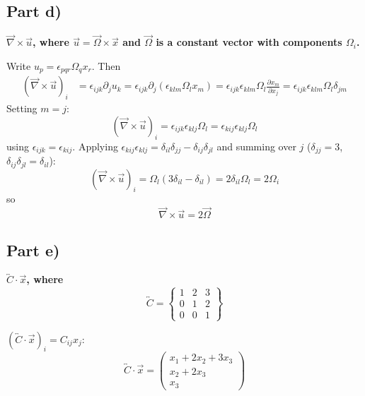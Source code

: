 \documentclass[12pt]{article}
\newcommand{\pd}[2]{\frac{\partial #1}{\partial #2}}
\newcommand{\ten}[1]{\overleftrightarrow{#1}}
\begin{document}
\subsection*{Part d)}
\textbf{$\vec\nabla \times \vec u$, where $\vec u = \vec\Omega \times \vec x$ and $\vec\Omega$ is a constant vector with components $\Omega_i$.}

Write $u_p = \epsilon_{pqr}\Omega_qx_r$. Then
\begin{align*}
    (\vec\nabla\times\vec u)_i &= \epsilon_{ijk}\partial_ju_k = \epsilon_{ijk}\partial_j\left(\epsilon_{klm}\Omega_lx_m\right) = \epsilon_{ijk}\epsilon_{klm}\Omega_l\pd{x_m}{x_j} = \epsilon_{ijk}\epsilon_{klm}\Omega_l\delta_{jm}
\end{align*}
Setting $m = j$:
\begin{equation*}
    (\vec\nabla\times\vec u)_i = \epsilon_{ijk}\epsilon_{klj}\Omega_l = \epsilon_{kij}\epsilon_{klj}\Omega_l
\end{equation*}
using $\epsilon_{ijk} = \epsilon_{kij}$. Applying $\epsilon_{kij}\epsilon_{klj} = \delta_{il}\delta_{jj} - \delta_{ij}\delta_{jl}$ and summing over $j$ ($\delta_{jj} = 3$, $\delta_{ij}\delta_{jl} = \delta_{il}$):
\begin{equation*}
    (\vec\nabla\times\vec u)_i = \Omega_l\left(3\delta_{il} - \delta_{il}\right) = 2\delta_{il}\Omega_l = 2\Omega_i
\end{equation*}
so
\begin{equation}
    \boxed{\vec\nabla\times\vec u = 2\vec\Omega}
\end{equation}

\subsection*{Part e)}
\textbf{$\ten C \cdot \vec x$, where}
\begin{equation*}
    \ten C = \left\{ \begin{array}{ccc} 1 & 2 & 3 \\ 0 & 1 & 2 \\ 0 & 0 & 1 \end{array} \right\}
\end{equation*}

$(\ten C \cdot \vec x)_i = C_{ij}x_j$:
\begin{equation}
    \boxed{
    \ten C \cdot \vec x =
    \begin{pmatrix}
        x_1 + 2x_2 + 3x_3 \\
        x_2 + 2x_3 \\
        x_3
    \end{pmatrix}
    }
\end{equation}
\end{document}
